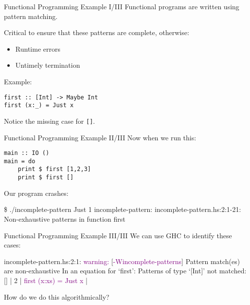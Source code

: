 \begin{frame}[fragile]{Functional Programming Example I/III}
Functional programs are written using pattern matching.

Critical to ensure that these patterns are complete, otherwise:

\begin{itemize}
    \item Runtime errors
    \item Untimely termination
\end{itemize}

Example:
\begin{lstlisting}
first :: [Int] -> Maybe Int
first (x:_) = Just x
\end{lstlisting}

Notice the missing case for \texttt{[]}.
\end{frame}

\begin{frame}[fragile]{Functional Programming Example II/III}
Now when we run this:

\begin{lstlisting}
main :: IO ()
main = do
    print $ first [1,2,3]
    print $ first []
\end{lstlisting}

Our program crashes:

\begin{footnotesize}
\begin{semiverbatim}
\$ ./incomplete-pattern 
Just 1
incomplete-pattern: incomplete-pattern.hs:2:1-21: 
    Non-exhaustive patterns in function first
\end{semiverbatim}
\end{footnotesize}
\end{frame}

\begin{frame}[fragile]{Functional Programming Example III/III}
We can use GHC to identify these cases:

\begin{footnotesize}
\begin{semiverbatim}
incomplete-pattern.hs:2:1: \textcolor{Purple}{warning:} [\textcolor{Purple}{-Wincomplete-patterns}]
    Pattern match(es) are non-exhaustive
    In an equation for ‘first’:
        Patterns of type ‘[Int]’ not matched: []
  |
2 | \textcolor{Purple}{first (x:xs) = Just x}
  | \textcolor{Purple}{^^^^^^^^^^^^^^^^^^^^^}
\end{semiverbatim}
\end{footnotesize}

How do we do this algorithmically?
\end{frame}

